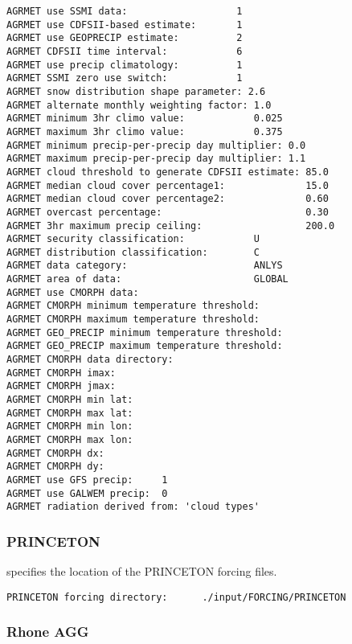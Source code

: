 \begin{Verbatim}[frame=single]
AGRMET use SSMI data:                   1
AGRMET use CDFSII-based estimate:       1
AGRMET use GEOPRECIP estimate:          2
AGRMET CDFSII time interval:            6
AGRMET use precip climatology:          1
AGRMET SSMI zero use switch:            1
AGRMET snow distribution shape parameter: 2.6
AGRMET alternate monthly weighting factor: 1.0
AGRMET minimum 3hr climo value:            0.025
AGRMET maximum 3hr climo value:            0.375
AGRMET minimum precip-per-precip day multiplier: 0.0
AGRMET maximum precip-per-precip day multiplier: 1.1
AGRMET cloud threshold to generate CDFSII estimate: 85.0
AGRMET median cloud cover percentage1:              15.0
AGRMET median cloud cover percentage2:              0.60
AGRMET overcast percentage:                         0.30
AGRMET 3hr maximum precip ceiling:                  200.0
AGRMET security classification:            U
AGRMET distribution classification:        C
AGRMET data category:                      ANLYS
AGRMET area of data:                       GLOBAL
AGRMET use CMORPH data:
AGRMET CMORPH minimum temperature threshold:
AGRMET CMORPH maximum temperature threshold:
AGRMET GEO_PRECIP minimum temperature threshold:
AGRMET GEO_PRECIP maximum temperature threshold:
AGRMET CMORPH data directory:
AGRMET CMORPH imax:
AGRMET CMORPH jmax:
AGRMET CMORPH min lat:
AGRMET CMORPH max lat:
AGRMET CMORPH min lon:
AGRMET CMORPH max lon:
AGRMET CMORPH dx:
AGRMET CMORPH dy:
AGRMET use GFS precip:     1
AGRMET use GALWEM precip:  0
AGRMET radiation derived from: 'cloud types'
 \end{Verbatim}
 

 
 \subsubsection{PRINCETON} \label{sssec:forcings_princeton}
 

 
  specifies the location of the
 PRINCETON forcing files.
 

 \begin{Verbatim}[frame=single]
PRINCETON forcing directory:      ./input/FORCING/PRINCETON
 \end{Verbatim}

 
 \subsubsection{Rhone AGG} \label{sssec:forcings_rhone}
 

